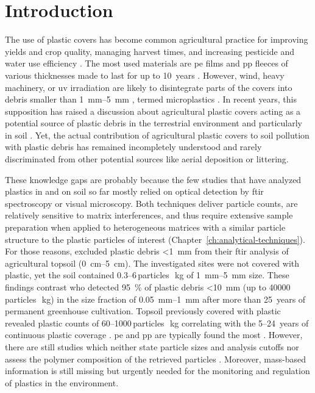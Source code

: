 \section{Introduction}

The use of plastic covers has become common agricultural practice for improving yields and crop quality, managing harvest times, and increasing pesticide and water use efficiency \citep[Chapter~\ref{ch:plastic-mulching};][]{LamontPlastic1993}. The most used materials are \ac{pe} films and \ac{pp} fleeces of various thicknesses made to last for up to \num{10}~years \citep{BertlingKunststoffe2021}. However, wind, heavy machinery, or \ac{uv} irradiation are likely to disintegrate parts of the covers into debris smaller than \SIrange{1}{5}{\milli\meter} \citep{Scarascia-MugnozzaPlastic2011}, termed microplastics \citep{HartmannAre2019}. In recent years, this supposition has raised a discussion about agricultural plastic covers acting as a potential source of plastic debris in the terrestrial environment and particularly in soil \citep[Chapter~\ref{ch:plastic-mulching};][]{HurleyFate2018}. Yet, the actual contribution of agricultural plastic covers to soil pollution with plastic debris has remained incompletely understood and rarely discriminated from other potential sources like aerial deposition or littering.

These knowledge gaps are probably because the few studies that have analyzed plastics in and on soil so far mostly relied on optical detection by \ac{ftir} spectroscopy or visual microscopy. Both techniques deliver particle counts, are relatively sensitive to matrix interferences, and thus require extensive sample preparation when applied to heterogeneous matrices with a similar particle structure to the plastic particles of interest (Chapter~\ref{ch:analytical-techniques}). For those reasons, \citet{PiehlIdentification2018,HarmsAmount2021} excluded plastic debris \SI{<1}{\milli\meter} from their \ac{ftir} analysis of agricultural topsoil (\SIrange{0}{5}{\centi\meter}). The investigated sites were not covered with plastic, yet the soil contained \numrange[range-phrase={ to }]{0.3}{6}\,particles\,\si{\per\kilo\gram} of \SIrange{1}{5}{\milli\meter} size. These findings contrast \citet{ZhangDistribution2018} who detected \SI{95}{\percent} of plastic debris \SI{<10}{\milli\meter} (up to \num{40000}\,particles\,\si{\per\kilo\gram}) in the size fraction of \SIrange{0.05}{1}{\milli\meter} after more than \num{25}~years of permanent greenhouse cultivation. Topsoil previously covered with plastic revealed plastic counts of \numrange[range-phrase={ up to }]{60}{1000}\,particles\,\si{\per\kilo\gram} correlating with the \numrange{5}{24}~years of continuous plastic coverage \citep{HuangAgricultural2020}. \ac{pe} and \ac{pp} are typically found the most \citep{HarmsAmount2021,KimAbundance2021}. However, there are still studies which neither state particle sizes and analysis cutoffs nor assess the polymer composition of the retrieved particles \citep[for example,][]{ZhangSimple2018,BeriotLow2021}. Moreover, mass-based information is still missing but urgently needed for the monitoring and regulation of plastics in the environment.

